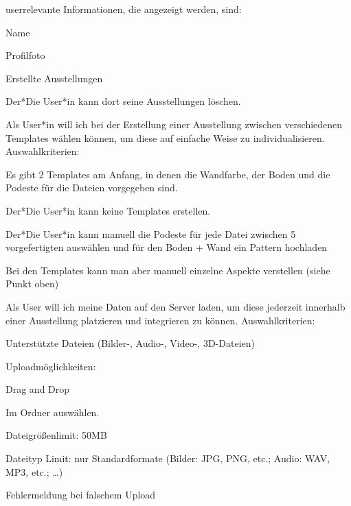 \begin{compactenum}
\begin{compactitem}
        \item userrelevante Informationen, die angezeigt werden, sind: 
        \begin{compactitem}
            \item Name
            \item Profilfoto
            \item Erstellte Ausstellungen        
        \end{compactitem}
        \item Der*Die User*in kann dort seine Ausstellungen löschen.         
    \end{compactitem} 
    \item  Als User*in will ich bei der Erstellung einer Ausstellung zwischen verschiedenen Templates wählen können, um diese auf einfache Weise zu individualisieren. Auswahlkriterien: 
    \begin{compactitem}
        \item Es gibt 2 Templates am Anfang, in denen die Wandfarbe, der Boden und die Podeste für die Dateien vorgegeben sind.
        \item Der*Die User*in kann keine Templates erstellen.
        \item Der*Die User*in kann manuell die Podeste für jede Datei zwischen 5 vorgefertigten auswählen und für den Boden + Wand ein Pattern hochladen
        \item Bei den Templates kann man aber manuell einzelne Aspekte verstellen (siehe Punkt oben)
    \end{compactitem} 
    \item Als User will ich meine Daten auf den Server laden, um diese jederzeit innerhalb einer Ausstellung platzieren und integrieren zu können. Auswahlkriterien: 
    \begin{compactitem}
        \item Unterstützte Dateien (Bilder-, Audio-, Video-, 3D-Dateien) 
        \item Uploadmöglichkeiten: 
        \begin{compactitem}
            \item Drag and Drop
            \item Im Ordner auswählen.
        \end{compactitem} 
        \item Dateigrößenlimit: 50MB
        \item Dateityp Limit: nur Standardformate (Bilder: JPG, PNG, etc.;        Audio: WAV, MP3, etc.; …)
        \item Fehlermeldung bei falschem Upload

\end{compactitem}
\end{compactenum}
